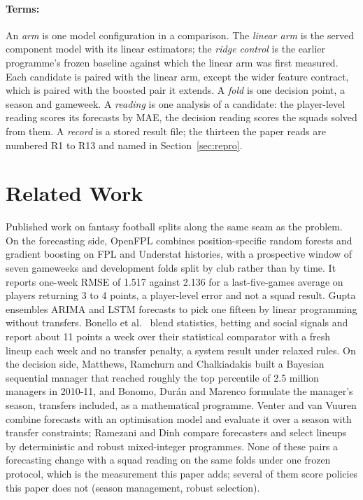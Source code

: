 \documentclass[11pt,a4paper]{article}
\begin{document}
\paragraph{Terms:} An \emph{arm} is one model configuration in a comparison. The \emph{linear arm} is the served component model with its linear estimators; the \emph{ridge control} is the earlier programme's frozen baseline against which the linear arm was first measured. Each candidate is paired with the linear arm, except the wider feature contract, which is paired with the boosted pair it extends. A \emph{fold} is one decision point, a season and gameweek. A \emph{reading} is one analysis of a candidate: the player-level reading scores its forecasts by MAE, the decision reading scores the squads solved from them. A \emph{record} is a stored result file; the thirteen the paper reads are numbered R1 to R13 and named in Section~\ref{sec:repro}.

\section{Related Work}
\label{sec:related}

Published work on fantasy football splits along the same seam as the problem. On the forecasting side, OpenFPL \cite{groos2025} combines position-specific random forests and gradient boosting on FPL and Understat histories, with a prospective window of seven gameweeks and development folds split by club rather than by time. It reports one-week RMSE of 1.517 against 2.136 for a last-five-games average on players returning 3 to 4 points, a player-level error and not a squad result. Gupta \cite{gupta2019} ensembles ARIMA and LSTM forecasts to pick one fifteen by linear programming without transfers. Bonello et al.\ \cite{bonello2019} blend statistics, betting and social signals and report about 11 points a week over their statistical comparator with a fresh lineup each week and no transfer penalty, a system result under relaxed rules. On the decision side, Matthews, Ramchurn and Chalkiadakis \cite{matthews2012} built a Bayesian sequential manager that reached roughly the top percentile of 2.5 million managers in 2010-11, and Bonomo, Dur\'an and Marenco \cite{bonomo2014} formulate the manager's season, transfers included, as a mathematical programme. Venter and van Vuuren \cite{venter2024} combine forecasts with an optimisation model and evaluate it over a season with transfer constraints; Ramezani and Dinh \cite{ramezani2026} compare forecasters and select lineups by deterministic and robust mixed-integer programmes. None of these pairs a forecasting change with a squad reading on the same folds under one frozen protocol, which is the measurement this paper adds; several of them score policies this paper does not (season management, robust selection).
\end{document}
